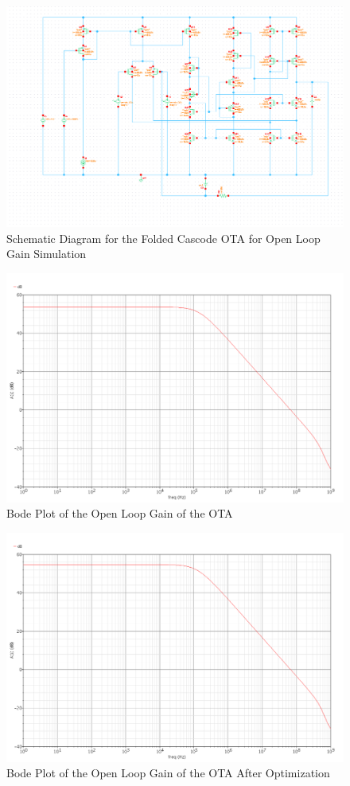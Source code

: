 \documentclass{article}
\begin{document}
\begin{figure}[H]
\centering
\includegraphics[width=5.5in]{bullet4_schem.png}
\caption{Schematic Diagram for the Folded Cascode OTA for Open Loop Gain Simulation}
\label{b4_schem}
\end{figure}

\begin{figure}[H]
\centering
\includegraphics[width=6in]{bullet4_bode.png}
\caption{Bode Plot of the Open Loop Gain of the OTA}
\label{b4_bode}
\end{figure}

\begin{figure}[H]
\centering
\includegraphics[width=5.5in]{bullet4_bode_opt.png}
\caption{Bode Plot of the Open Loop Gain of the OTA After Optimization}
\label{b4_bode_opt}
\end{figure}
\newpage
\end{document}
